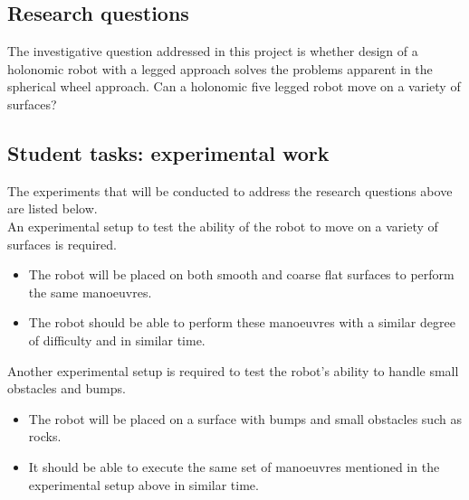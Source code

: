 \vspace{5em}

\subsection{Research questions}
The investigative question addressed in this project is whether design of a holonomic robot with a legged approach solves the problems apparent in the spherical wheel approach. Can a holonomic five legged robot move on a variety of surfaces?

\subsection{Student tasks: experimental work}
The experiments that will be conducted to address the research questions above are listed below.\\

An experimental setup to test the ability of the robot to move on a variety of surfaces is required.
\begin{itemize}
\item The robot will be placed on both smooth and coarse flat surfaces to perform the same manoeuvres.
\item The robot should be able to perform these manoeuvres with a similar degree of difficulty and in similar time.
\end{itemize}
Another experimental setup is required to test the robot's ability to handle small obstacles and bumps.
\begin{itemize}
\item The robot will be placed on a surface with bumps and small obstacles such as rocks.
\item It should be able to execute the same set of manoeuvres mentioned in the experimental setup above in similar time.
\end{itemize}
\newpage 



